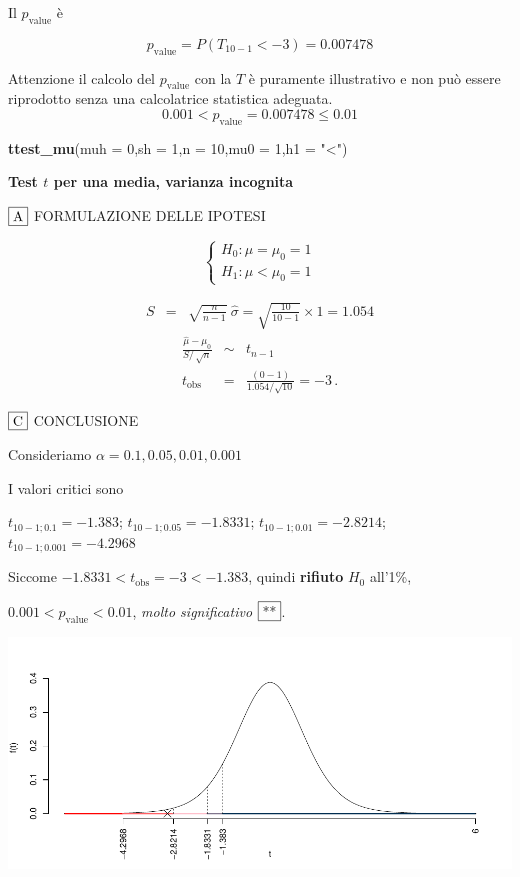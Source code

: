 \documentclass[
  11pt,
]{book}
\newenvironment{Shaded}{\begin{snugshade}}{\end{snugshade}}
\newcommand{\AttributeTok}[1]{\textcolor[rgb]{0.13,0.29,0.53}{#1}}
\newcommand{\DecValTok}[1]{\textcolor[rgb]{0.00,0.00,0.81}{#1}}
\newcommand{\FunctionTok}[1]{\textcolor[rgb]{0.13,0.29,0.53}{\textbf{#1}}}
\newcommand{\NormalTok}[1]{#1}
\newcommand{\StringTok}[1]{\textcolor[rgb]{0.31,0.60,0.02}{#1}}
\theoremstyle{mytheoremstyle}
\theoremstyle{mydefstyle}
\begin{document}
Il \(p_{\text{value}}\) è

\[ p_{\text{value}} = P(T_{10-1}<-3)=0.007478 \]

Attenzione il calcolo del \(p_\text{value}\) con la \(T\) è puramente illustrativo e non può essere riprodotto senza una calcolatrice statistica adeguata.\[
 0.001 < p_\text{value}= 0.007478 \leq 0.01 
\]

\begin{Shaded}
\begin{Highlighting}[]
\FunctionTok{ttest\_mu}\NormalTok{(}\AttributeTok{muh =} \DecValTok{0}\NormalTok{,}\AttributeTok{sh =} \DecValTok{1}\NormalTok{,}\AttributeTok{n =} \DecValTok{10}\NormalTok{,}\AttributeTok{mu0 =} \DecValTok{1}\NormalTok{,}\AttributeTok{h1 =} \StringTok{"\textless{}"}\NormalTok{)}
\end{Highlighting}
\end{Shaded}

\textbf{Test \(t\) per una media, varianza incognita}

\(\fbox{A}\) FORMULAZIONE DELLE IPOTESI

\[\begin{cases}
   H_0: \mu = \mu_0=1 \\
   H_1: \mu < \mu_0=1 
   \end{cases}\]

\begin{eqnarray*}
   S    &=& \sqrt{\frac{n} {n-1}}\ \widehat{\sigma} 
   =  \sqrt{\frac{ 10 } { 10 -1}} \times  1  =  1.054 
   \end{eqnarray*}
\begin{eqnarray*}
   \frac{\hat\mu - \mu_{0}} {S/\,\sqrt{n}}&\sim&t_{n-1}\\
   t_{\text{obs}}
   &=& \frac{ ( 0 -  1 )} { 1.054 /\sqrt{ 10 }}
   =   -3 \, .
   \end{eqnarray*}

\(\fbox{C}\) CONCLUSIONE

Consideriamo \(\alpha=0.1, 0.05, 0.01, 0.001\)

I valori critici sono

\(t_{10-1;0.1}=-1.383\); \(t_{10-1;0.05}=-1.8331\); \(t_{10-1;0.01}=-2.8214\); \(t_{10-1;0.001}=-4.2968\)

Siccome \(-1.8331<t_\text{obs}=-3<-1.383\), quindi \textbf{rifiuto} \(H_0\) all'1\%,

\(0.001<p_\text{value}<0.01\), \emph{molto significativo} \(\fbox{**}\).

\begin{center}\includegraphics{Appunti_di_Statistica_2025_files/figure-latex/25-test-functions-10-5} \end{center}
\end{document}
